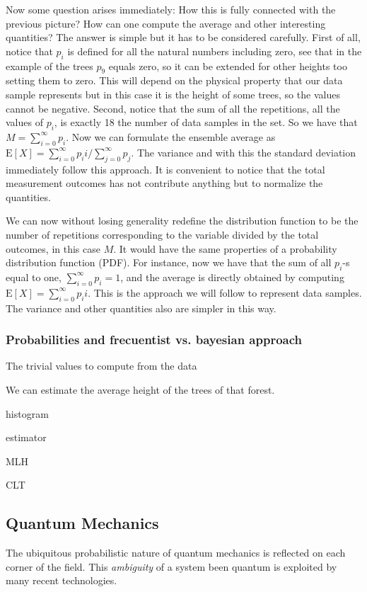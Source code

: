 Now some question arises immediately:
How this is fully connected with the previous picture?
How can one compute the average and other interesting quantities?
The answer is simple but it has to be considered carefully.
First of all, notice that $p_i$ is defined for all the natural numbers including zero, see that in the example of the trees $p_9$ equals zero, so it can be extended for other heights too setting them to zero.
This will depend on the physical property that our data sample represents but in this case it is the height of some trees, so the values cannot be negative.
Second, notice that the sum of all the repetitions, all the values of $p_i$, is exactly 18 the number of data samples in the set.
So we have that $M = \sum_{i=0}^{\infty} p_i$.
Now we can formulate the ensemble average as $\text{E}[X]=\sum_{i=0}^{\infty} p_i i / \sum_{j=0}^{\infty} p_j$. The variance and with this the standard deviation immediately follow this approach.
It is convenient to notice that the total measurement outcomes has not contribute anything but to normalize the quantities.

We can now without losing generality redefine the distribution function to be the number of repetitions corresponding to the variable divided by the total outcomes, in this case $M$.
It would have the same properties of a probability distribution function (PDF).
For instance, now we have that the sum of all $p_i$-s equal to one, $\sum_{i=0}^\infty p_i = 1$, and the average is directly obtained by computing  $\text{E}[X] = \sum_{i=0}^\infty p_i i$.
This is the approach we will follow to represent data samples.
The variance and other quantities also are simpler in this way.

\subsubsection{Probabilities and frecuentist vs. bayesian approach}

The trivial values to compute from the data

We can estimate the average height of the trees of that forest.

histogram

estimator

MLH

CLT




\subsection{Quantum Mechanics}
The ubiquitous probabilistic nature of quantum mechanics is reflected on each corner of the field.
This \emph{ambiguity} of a system been quantum is exploited by many recent technologies.

